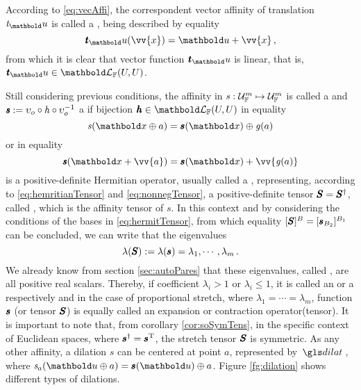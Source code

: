 According to \eqref{eq:vecAffi}, the correspondent vector affinity of translation $\mathit{t}_\vto{u}$ is called a , being described by equality
\begin{equation}\label{eq:transltVec}
\fua{\tnr{\mathit{t}}_\vto{u}}{\vv{x}}=\vto{u} + \vv{x}\,,
\end{equation}
from which it is clear that vector function $\tnr{\mathit{t}}_\vto{u}$ is linear, that is, $\tnr{\mathit{t}}_\vto{u}\in\evl{\cam{F}}{U}{U}$.

Still considering previous conditions, the affinity in $\map{\mathit{s}}{\eamd{U}{F}{m}}{\eamd{U}{F}{m}}$ is called a  and $\tnr{\mathit{s}}:= \upsilon_o\circ\mathit{h}\circ\upsilon_o^{-1}$ a  if bijection $\vtf{h}\in\evl{\cam{F}}{U}{U}$ in equality
\begin{equation}\label{eq:dilat}
\fua{\mathit{s}}{\vto{x}\oplus a}=\fua{\vtf{s}}{\vto{x}}\oplus\fua{\mathit{g}}{a}
\end{equation}
or in equality
\begin{equation}\label{eq:dilatVec}
\fua{\tnr{\mathit{s}}}{\vto{x}+ \vv{a}}=\fua{\vtf{s}}{\vto{x}}+\vv{\fua{\mathit{g}}{a}}
\end{equation}
is a positive-definite Hermitian operator, usually called a , representing, according to \eqref{eq:hemritianTensor} and \eqref{eq:nonnegTensor}, a positive-definite tensor $\tnr{S}=\tnr{S}^\dagger$, called , which is the affinity tensor of $\mathit{s}$. In this context and by considering the conditions of the bases in \eqref{eq:hermitTensor}, from which equality $[\tnr{S}]^{B}={[{\vtf{s}}_{B_2}]^{B_1}}$ can be concluded, we can write that the eigenvalues 
\begin{equation}
\lambda(\tnr{S}):=\lambda(\vtf{s})=\lambda_1,\cdots,\lambda_m\,.
\end{equation}
We already know from section \ref{sec:autoPares} that these eigenvalues, called , are all positive real scalars. Thereby, if coefficient $\lambda_i>1$ or $\lambda_i\leqslant1$, it is called an  or a  respectively and in the case of proportional stretch, where $\lambda_1=\cdots=\lambda_m$, function $\vtf{s}$ (or tensor $\tnr{S}$) is equally called an expansion or contraction operator(tensor). It is important to note that, from corollary \ref{cor:soSymTens}, in the specific context of Euclidean spaces, where $\vtf{s}^\dagger=\vtf{s}^\text{T}$, the stretch tensor $\tnr{S}$ is symmetric. As any other affinity, a dilation $\mathit{s}$ can be centered at point $a$, represented by $\gloref{dilat}$, where $\fua{\mathit{s}_a}{\vto{u}\oplus a}=\fua{\vtf{s}}{\vto{u}}\oplus a$. Figure \ref{fg:dilation} shows different types of dilations.
